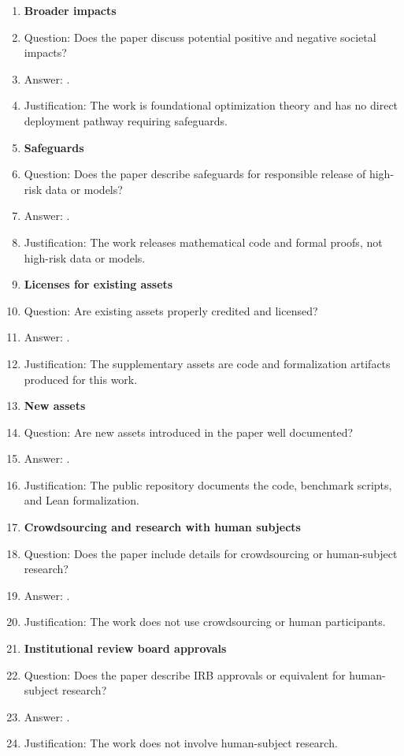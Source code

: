\documentclass{article}
\theoremstyle{plain}
\begin{document}
\begin{enumerate}
\item {\bf Broader impacts}
\item[] Question: Does the paper discuss potential positive and negative societal impacts?
\item[] Answer: \answerNA{}.
\item[] Justification: The work is foundational optimization theory and has no direct deployment pathway requiring safeguards.

\item {\bf Safeguards}
\item[] Question: Does the paper describe safeguards for responsible release of high-risk data or models?
\item[] Answer: \answerNA{}.
\item[] Justification: The work releases mathematical code and formal proofs, not high-risk data or models.

\item {\bf Licenses for existing assets}
\item[] Question: Are existing assets properly credited and licensed?
\item[] Answer: \answerNA{}.
\item[] Justification: The supplementary assets are code and formalization artifacts produced for this work.

\item {\bf New assets}
\item[] Question: Are new assets introduced in the paper well documented?
\item[] Answer: \answerYes{}.
\item[] Justification: The public repository documents the code, benchmark scripts, and Lean formalization.

\item {\bf Crowdsourcing and research with human subjects}
\item[] Question: Does the paper include details for crowdsourcing or human-subject research?
\item[] Answer: \answerNA{}.
\item[] Justification: The work does not use crowdsourcing or human participants.

\item {\bf Institutional review board approvals}
\item[] Question: Does the paper describe IRB approvals or equivalent for human-subject research?
\item[] Answer: \answerNA{}.
\item[] Justification: The work does not involve human-subject research.


\end{enumerate}
\end{document}
